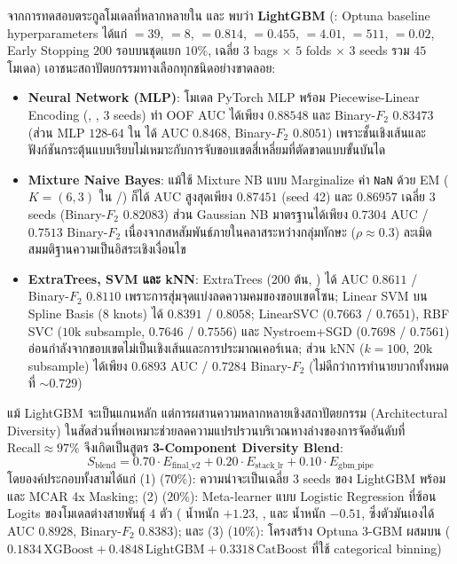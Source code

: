 จากการทดสอบตระกูลโมเดลที่หลากหลายใน  และ  พบว่า \textbf{LightGBM} (: Optuna baseline hyperparameters ได้แก่  $= 39$,  $= 8$,  $= 0.814$,  $= 0.455$,  $= 4.01$,  $= 511$,  $= 0.02$, Early Stopping $200$ รอบบนชุดแยก $10\%$, เฉลี่ย $3$ bags $\times$ $5$ folds $\times$ $3$ seeds รวม $45$ โมเดล) เอาชนะสถาปัตยกรรมทางเลือกทุกชนิดอย่างขาดลอย:
\begin{itemize}
  \item \textbf{Neural Network (MLP)}: โมเดล PyTorch MLP พร้อม Piecewise-Linear Encoding (, , 3 seeds) ทำ OOF AUC ได้เพียง $0.88548$ และ Binary-$F_2$ $0.83473$ (ส่วน MLP $128$-$64$ ใน  ได้ AUC $0.8468$, Binary-$F_2$ $0.8051$) เพราะชั้นเชิงเส้นและฟังก์ชันกระตุ้นแบบเรียบไม่เหมาะกับการจับขอบเขตสี่เหลี่ยมที่ตัดขาดแบบขั้นบันได
  \item \textbf{Mixture Naive Bayes}: แม้ใช้ Mixture NB แบบ Marginalize ค่า \texttt{NaN} ด้วย EM ($K=(6,3)$ ใน /) ก็ได้ AUC สูงสุดเพียง $0.87451$ (seed 42) และ $0.86957$ เฉลี่ย 3 seeds (Binary-$F_2$ $0.82083$) ส่วน Gaussian NB มาตรฐานได้เพียง $0.7304$ AUC / $0.7513$ Binary-$F_2$ เนื่องจากสหสัมพันธ์ภายในคลาสระหว่างกลุ่มทักษะ ($\rho \approx 0.3$) ละเมิดสมมติฐานความเป็นอิสระเชิงเงื่อนไข
  \item \textbf{ExtraTrees, SVM และ kNN}: ExtraTrees ($200$ ต้น, ) ได้ AUC $0.8611$ / Binary-$F_2$ $0.8110$ เพราะการสุ่มจุดแบ่งลดความคมของขอบเขตโซน; Linear SVM บน Spline Basis ($8$ knots) ได้ $0.8391$ / $0.8058$; LinearSVC ($0.7663$ / $0.7651$), RBF SVC ($10\text{k}$ subsample, $0.7646$ / $0.7556$) และ Nystroem+SGD ($0.7698$ / $0.7561$) อ่อนกำลังจากขอบเขตไม่เป็นเชิงเส้นและการประมาณเคอร์เนล; ส่วน kNN ($k=100$, $20\text{k}$ subsample) ได้เพียง $0.6893$ AUC / $0.7284$ Binary-$F_2$ (ไม่ดีกว่าการทำนายบวกทั้งหมดที่ $\sim 0.729$)
\end{itemize}

แม้ LightGBM จะเป็นแกนหลัก แต่การผสานความหลากหลายเชิงสถาปัตยกรรม (Architectural Diversity) ในสัดส่วนที่พอเหมาะช่วยลดความแปรปรวนบริเวณหางล่างของการจัดอันดับที่ $\text{Recall} \approx 97\%$ จึงเกิดเป็นสูตร \textbf{3-Component Diversity Blend}:
\begin{equation}
S_{\text{blend}} = 0.70 \cdot E_{\text{final\_v2}} + 0.20 \cdot E_{\text{stack\_lr}} + 0.10 \cdot E_{\text{gbm\_pipe}}
\label{eq:t1_blend}
\end{equation}
โดยองค์ประกอบทั้งสามได้แก่ (1)  ($70\%$): ความน่าจะเป็นเฉลี่ย 3 seeds ของ LightGBM พร้อม  และ MCAR 4x Masking; (2)  ($20\%$): Meta-learner แบบ Logistic Regression ที่ซ้อน Logits ของโมเดลต่างสายพันธุ์ $4$ ตัว ( น้ำหนัก $+1.23$, ,  และ  น้ำหนัก $-0.51$, ซึ่งตัวมันเองได้ AUC $0.8928$, Binary-$F_2$ $0.8383$); และ (3)  ($10\%$): โครงสร้าง Optuna 3-GBM ผสมบน  ($0.1834\,\text{XGBoost} + 0.4848\,\text{LightGBM} + 0.3318\,\text{CatBoost}$ ที่ใช้ categorical binning)

